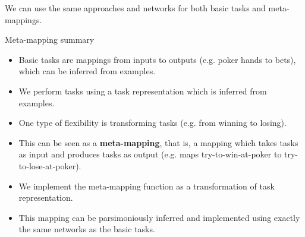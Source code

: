\documentclass{beamer}
\begin{document}
\begin{frame}
\begin{columns}
\begin{column}{\dimexpr\paperwidth-10pt}
{}
\end{column}
\end{columns}
\end{frame}




\begin{frame}[standout]
We can use the same approaches and networks for both basic tasks and meta-mappings.
\end{frame}

\begin{frame}{Meta-mapping summary}
\begin{itemize}[<+->]
\item Basic tasks are mappings from inputs to outputs (e.g. poker hands to bets), which can be inferred from examples.
\item We perform tasks using a task representation which is inferred from examples.
\item One type of flexibility is transforming tasks (e.g. from winning to losing).
\item This can be seen as a \textbf{meta-mapping}, that is, a mapping which takes tasks as input and produces tasks as output (e.g. maps try-to-win-at-poker to try-to-lose-at-poker).
\item We implement the meta-mapping function as a transformation of task representation.
\item This mapping can be parsimoniously inferred and implemented using exactly the same networks as the basic tasks.
\end{itemize}
\end{frame}
\end{document}
